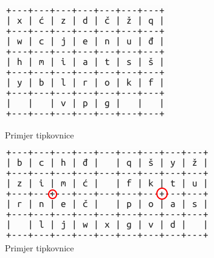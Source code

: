 \documentclass[times, utf8, zavrsni]{fer}
\begin{document}
\begin{figure}[htb]
  \centering
  \begin{minipage}[b]{0.48\textwidth}
    \includegraphics[width=\textwidth]{img/primjer.png}
    \caption{Primjer tipkovnice}
    \label{fig:fitts_primjer}
  \end{minipage}
  \hfill
  \begin{minipage}[b]{0.48\textwidth}
    \includegraphics[width=\textwidth]{img/2hand_primjer.png}
    \caption{Primjer tipkovnice}
    \label{fig:fitts_primjer2}
  \end{minipage}
\end{figure}
\end{document}
